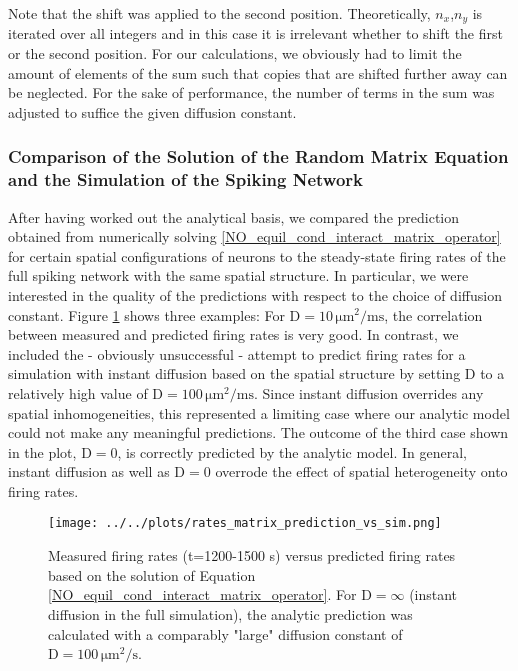 \documentclass[10pt,a4paper]{article}
\begin{document}
Note that the shift was applied to the second position. Theoretically, $n_x$,$n_y$ is iterated over all integers and in this case it is irrelevant whether to shift the first or the second position. For our calculations, we obviously had to limit the amount of elements of the sum such that copies that are shifted further away can be neglected. For the sake of performance, the number of terms in the sum was adjusted to suffice the given diffusion constant.

\subsubsection{Comparison of the Solution of the Random Matrix Equation and the Simulation of the Spiking Network}\label{Section_Rand_Mat_vs_Sim}
After having worked out the analytical basis, we compared the prediction obtained from numerically solving \eqref{NO_equil_cond_interact_matrix_operator} for certain spatial configurations of neurons to the steady-state firing rates of the full spiking network with the same spatial structure. In particular, we were interested in the quality of the predictions with respect to the choice of diffusion constant. Figure \ref{Rand_Matrix_Sol_vs_Sim} shows three examples: For $\mathrm{D=10\, \mu m^2 /ms}$, the correlation between measured and predicted firing rates is very good. In contrast, we included the - obviously unsuccessful - attempt to predict firing rates for a simulation with instant diffusion based on the spatial structure by setting D to a relatively high value of $\mathrm{D=100\, \mu m^2 /ms}$. Since instant diffusion overrides any spatial inhomogeneities, this represented a limiting case where our analytic model could not make any meaningful predictions. The outcome of the third case shown in the plot, $\mathrm{D=0}$, is correctly predicted by the analytic model. In general, instant diffusion as well as $\mathrm{D=0}$ overrode the effect of spatial heterogeneity onto firing rates. 
\begin{figure}
\texttt{[image: ../../plots/rates\_matrix\_prediction\_vs\_sim.png]}
\caption{Measured firing rates (t=1200-1500 s) versus predicted firing rates based on the solution of Equation \eqref{NO_equil_cond_interact_matrix_operator}. For $\mathrm{D=\infty}$ (instant diffusion in the full simulation), the analytic prediction was calculated with a comparably "large" diffusion constant of $\mathrm{D=100\, \mu m^2 /s}$.}
\label{Rand_Matrix_Sol_vs_Sim}
\end{figure}
\end{document}
